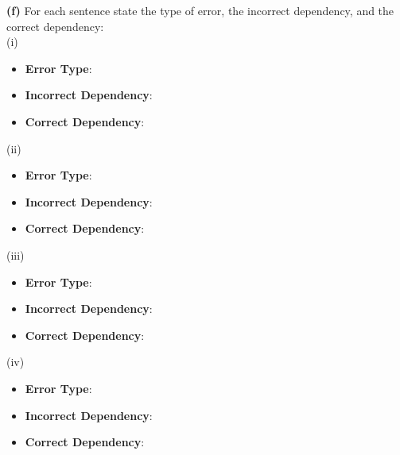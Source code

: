 \documentclass[10pt]{article}
\begin{document}
\textbf{(f)} For each sentence state the type of error, the incorrect dependency, and the correct dependency:\\

(i)\\

\begin{itemize}
\item \textbf{Error Type}:
\item \textbf{Incorrect Dependency}:
\item \textbf{Correct Dependency}:
\end{itemize}

(ii)\\

\begin{itemize}
\item \textbf{Error Type}:
\item \textbf{Incorrect Dependency}:
\item \textbf{Correct Dependency}:
\end{itemize}

(iii)\\

\begin{itemize}
\item \textbf{Error Type}:
\item \textbf{Incorrect Dependency}:
\item \textbf{Correct Dependency}:
\end{itemize}

(iv)\\

\begin{itemize}
\item \textbf{Error Type}:
\item \textbf{Incorrect Dependency}:
\item \textbf{Correct Dependency}:
\end{itemize}
\end{document}

